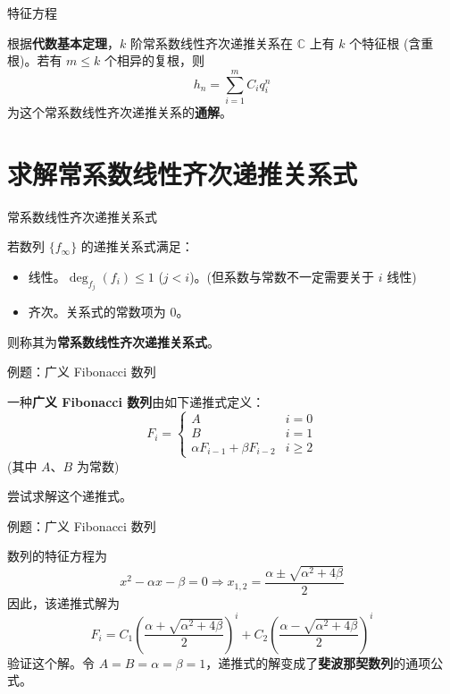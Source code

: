 \documentclass{beamer}
\begin{document}
\begin{frame}{特征方程}
    \begin{theorem}[常系数线性非齐次递推关系式的通解]
        根据\textbf{代数基本定理}，$k$ 阶常系数线性齐次递推关系在 $\mathbb C$ 上有 $k$ 个特征根 (含重根)。若有 $m \le k$ 个相异的复根，则
        $$
            h_n = \sum_{i=1}^m C_iq_i^n
        $$
        为这个常系数线性齐次递推关系的\textbf{通解}。
    \end{theorem}
\end{frame}

\section{求解常系数线性齐次递推关系式}

\begin{frame}{常系数线性齐次递推关系式}
    \begin{definition}
        若数列 $\{f_\infty\}$ 的递推关系式满足：
        \begin{itemize}
            \item 线性。$\deg_{f_j} (f_i) \leqslant 1$ ($j < i$)。(但系数与常数不一定需要关于 $i$ 线性)
            \item 齐次。关系式的常数项为 0。
        \end{itemize}
        则称其为\textbf{常系数线性齐次递推关系式}。
    \end{definition}    
\end{frame}

\begin{frame}{例题：广义 Fibonacci 数列}
    \begin{definition}
        一种\textbf{广义 Fibonacci 数列}由如下递推式定义：
        \begin{displaymath}
            F_i = \begin{cases} 
                A & i=0\\
                B & i=1\\
                \alpha F_{i-1} + \beta F_{i-2} & i\geqslant 2
              \end{cases}
        \end{displaymath}
        (其中 $A$、$B$ 为常数)
        
        尝试求解这个递推式。
    \end{definition}    
\end{frame}

\begin{frame}{例题：广义 Fibonacci 数列}
    \begin{solution}
        数列的特征方程为
        $$
        x^2 - \alpha x - \beta = 0 \Longrightarrow x_{1,2} = \frac{\alpha \pm \sqrt{\alpha^2 + 4\beta}}{2}
        $$
        \pause
        因此，该递推式解为
        $$
        F_i = C_1 \left(\frac{\alpha + \sqrt{\alpha^2 + 4\beta}}{2}\right)^i + C_2 \left(\frac{\alpha - \sqrt{\alpha^2 + 4\beta}}{2}\right)^i
        $$
        验证这个解。令 $A = B = \alpha = \beta = 1$，递推式的解变成了\textbf{斐波那契数列}的通项公式。
    \end{solution}

\end{frame}
\end{document}

